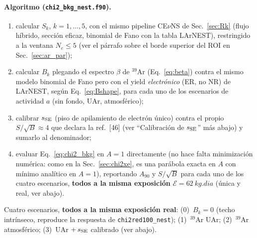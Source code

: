 \documentclass[11pt,a4paper]{article}
\newcommand{\Ne}{N_{e}}
\newcommand{\code}[1]{\texttt{#1}}
\begin{document}
\paragraph{Algoritmo (\code{chi2\_bkg\_nest.f90}).}
\begin{enumerate}\itemsep2pt
  \item calcular $S_{k}$, $k=1,\ldots,5$, con el mismo pipeline CE$\nu$NS de
    Sec.~\ref{sec:Rk} (flujo h\'ibrido, secci\'on eficaz, binomial de Fano con la
    tabla LArNEST), restringido a la ventana $\Ne\le5$ (ver el p\'arrafo sobre el
    borde superior del ROI en Sec.~\ref{sec:ar_par});
  \item calcular $B_{k}$ plegando el espectro $\beta$ de $^{39}$Ar
    (Eq.~\eqref{eq:beta}) contra el mismo modelo binomial de Fano pero con el
    yield \emph{electr\'onico} (ER, no NR) de LArNEST, seg\'un
    Eq.~\eqref{eq:Bshape}, para cada uno de los escenarios de actividad $a$
    (sin fondo, UAr, atmosf\'erico);
  \item calibrar $s_{\rm SE}$ (piso de apilamiento de electr\'on \'unico) contra
    el propio $S/\sqrt{B}\approx4$ que declara la ref.\ [46] (ver
    ``Calibraci\'on de $s_{\rm SE}$'' m\'as abajo) y sumarlo al denominador;
  \item evaluar Eq.~\eqref{eq:chi2_bkg} en $A=1$ directamente (no hace falta
    minimizaci\'on num\'erica: como en la Sec.~\ref{sec:chi2xe}, es una par\'abola
    exacta en $A$ con m\'inimo anal\'itico en $A=1$), reportando $A_{90}$ y
    $S/\sqrt{B}$ para cada uno de los cuatro escenarios, \textbf{todos a la
    misma exposici\'on} $\mathcal{E}=\SI{62}{kg.dia}$ (\'unica y real, ver
    abajo).
\end{enumerate}
Cuatro escenarios, \textbf{todos a la misma exposici\'on real}: (0)~$B_{k}=0$
(techo intr\'inseco, reproduce la respuesta de \code{chi2red100\_nest}); (1)~$^{39}$Ar
UAr; (2)~$^{39}$Ar atmosf\'erico; (3)~UAr $+\,s_{\rm SE}$ calibrado (ver abajo).
\end{document}
